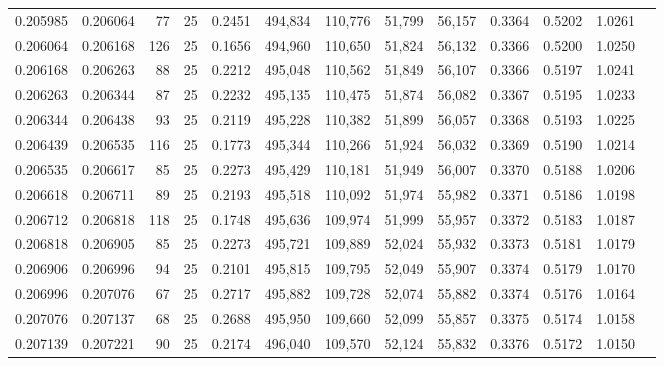 \begin{tabular}{rrrrrrrrrrrrr}
0.205985 & 0.206064 &    77 &  25 &                                     0.2451 & 494,834 & 110,776 &  51,799 &  56,157 & 0.3364 & 0.5202 & 1.0261 \\
0.206064 & 0.206168 &   126 &  25 &                                     0.1656 & 494,960 & 110,650 &  51,824 &  56,132 & 0.3366 & 0.5200 & 1.0250 \\
0.206168 & 0.206263 &    88 &  25 &                                     0.2212 & 495,048 & 110,562 &  51,849 &  56,107 & 0.3366 & 0.5197 & 1.0241 \\
0.206263 & 0.206344 &    87 &  25 &                                     0.2232 & 495,135 & 110,475 &  51,874 &  56,082 & 0.3367 & 0.5195 & 1.0233 \\
0.206344 & 0.206438 &    93 &  25 &                                     0.2119 & 495,228 & 110,382 &  51,899 &  56,057 & 0.3368 & 0.5193 & 1.0225 \\
0.206439 & 0.206535 &   116 &  25 &                                     0.1773 & 495,344 & 110,266 &  51,924 &  56,032 & 0.3369 & 0.5190 & 1.0214 \\
0.206535 & 0.206617 &    85 &  25 &                                     0.2273 & 495,429 & 110,181 &  51,949 &  56,007 & 0.3370 & 0.5188 & 1.0206 \\
0.206618 & 0.206711 &    89 &  25 &                                     0.2193 & 495,518 & 110,092 &  51,974 &  55,982 & 0.3371 & 0.5186 & 1.0198 \\
0.206712 & 0.206818 &   118 &  25 &                                     0.1748 & 495,636 & 109,974 &  51,999 &  55,957 & 0.3372 & 0.5183 & 1.0187 \\
0.206818 & 0.206905 &    85 &  25 &                                     0.2273 & 495,721 & 109,889 &  52,024 &  55,932 & 0.3373 & 0.5181 & 1.0179 \\
0.206906 & 0.206996 &    94 &  25 &                                     0.2101 & 495,815 & 109,795 &  52,049 &  55,907 & 0.3374 & 0.5179 & 1.0170 \\
0.206996 & 0.207076 &    67 &  25 &                                     0.2717 & 495,882 & 109,728 &  52,074 &  55,882 & 0.3374 & 0.5176 & 1.0164 \\
0.207076 & 0.207137 &    68 &  25 &                                     0.2688 & 495,950 & 109,660 &  52,099 &  55,857 & 0.3375 & 0.5174 & 1.0158 \\
0.207139 & 0.207221 &    90 &  25 &                                     0.2174 & 496,040 & 109,570 &  52,124 &  55,832 & 0.3376 & 0.5172 & 1.0150 \\

\end{tabular}
